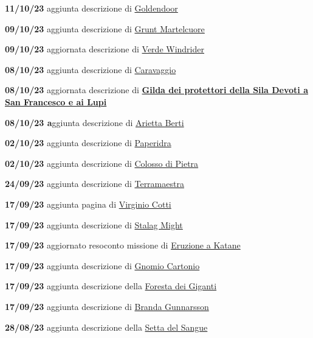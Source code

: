 \textbf{11/10/23} aggiunta descrizione di
\href{Goldendoor\%203f741f49e8f84ce19c7a3eae4aaf3779.md}{Goldendoor}

\textbf{09/10/23} aggiunta descrizione di
\href{Grunt\%20Martelcuore\%20904d4cbd76ee43c29753bdefdc19d019.md}{Grunt
Martelcuore}

\textbf{09/10/23} aggiornata descrizione di
\href{Verde\%20Windrider\%20340b448da1954bffb62f6980be563ea2.md}{Verde
Windrider}

\textbf{08/10/23} aggiunta descrizione di
\href{Caravaggio\%20085126a6bfcc4e48a2f654c751f29d4d.md}{Caravaggio}

\textbf{08/10/23} aggiornata descrizione di
\href{Gilda\%20dei\%20protettori\%20della\%20Sila\%20Devoti\%20a\%20San\%20Franc\%20e29bb7909af24fee931336355db913d4.md}{\textbf{Gilda
dei protettori della Sila Devoti a San Francesco e ai Lupi}}

\textbf{08/10/23 a}ggiunta descrizione di
\href{Arietta\%20Berti\%20adce52afef5f46068374483fcdda54c9.md}{Arietta
Berti}

\textbf{02/10/23} aggiunta descrizione di
\href{Paperidra\%20fb14298e444f4526a49b518790283588.md}{Paperidra}

\textbf{02/10/23} aggiunta descrizione di
\href{Colosso\%20di\%20Pietra\%20e86bfcf7509c43f68ad91526717e23b0.md}{Colosso
di Pietra}

\textbf{24/09/23} aggiunta descrizione di
\href{Terramaestra\%207baa6c3cd73e483fb4ade190a1dc230e.md}{Terramaestra}

\textbf{17/09/23} aggiunta pagina di
\href{Virginio\%20Cotti\%20a5fc4cabacd04cfcaea6190d7dbcdd09.md}{Virginio
Cotti}

\textbf{17/09/23} aggiunta descrizione di
\href{Stalag\%20Might\%2082c32b9a749a4543aae2e78474794fe6.md}{Stalag
Might}

\textbf{17/09/23} aggiornato resoconto missione di
\href{Eruzione\%20a\%20Katane\%2077dbdcb3007742d280122dc6d26d2991.md}{Eruzione
a Katane}

\textbf{17/09/23} aggiunta descrizione di
\href{Gnomio\%20Cartonio\%20765b9ff9da1e49eb8401026d43d749a9.md}{Gnomio
Cartonio}

\textbf{17/09/23} aggiunta descrizione della
\href{Foresta\%20dei\%20Giganti\%2003a15f8accd74ec0a08db3f3c9a26b2b.md}{Foresta
dei Giganti}

\textbf{17/09/23} aggiunta descrizione di
\href{Branda\%20Gunnarsson\%20f8c7d7de2863418e9d8a94419f4b2d74.md}{Branda
Gunnarsson}

\textbf{28/08/23} aggiunta descrizione della
\href{Setta\%20del\%20Sangue\%202859c4de945546eda0cee6fb151ef956.md}{Setta
del Sangue}

